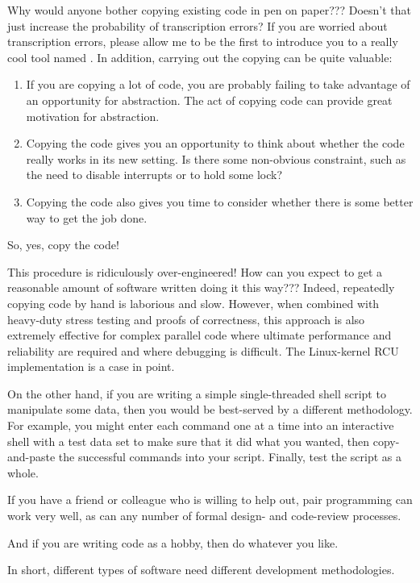 \QuickQ{}
	Why would anyone bother copying existing code in pen on paper???
	Doesn't that just increase the probability of transcription errors?
\QuickA{}
	If you are worried about transcription errors, please allow me
	to be the first to introduce you to a really cool tool named
	.
	In addition, carrying out the copying can be quite valuable:
	\begin{enumerate}
	\item	If you are copying a lot of code, you are probably failing
		to take advantage of an opportunity for abstraction.
		The act of copying code can provide great motivation
		for abstraction.
	\item	Copying the code gives you an opportunity to think about
		whether the code really works in its new setting.
		Is there some non-obvious constraint, such as the need
		to disable interrupts or to hold some lock?
	\item	Copying the code also gives you time to consider whether
		there is some better way to get the job done.
	\end{enumerate}
	So, yes, copy the code!

\QuickQ{}
	This procedure is ridiculously over-engineered!
	How can you expect to get a reasonable amount of software
	written doing it this way???
\QuickA{}
	Indeed, repeatedly copying code by hand is laborious and slow.
	However, when combined with heavy-duty stress testing and
	proofs of correctness, this approach is also extremely effective
	for complex parallel code where ultimate performance and
	reliability are required and where debugging is difficult.
	The Linux-kernel RCU implementation is a case in point.

	On the other hand, if you are writing a simple single-threaded
	shell script to manipulate some data, then you would be
	best-served by a different methodology.
	For example, you might enter each command one at a time
	into an interactive shell with a test data set to make
	sure that it did what you wanted, then copy-and-paste the
	successful commands into your script.
	Finally, test the script as a whole.

	If you have a friend or colleague who is willing to help out,
	pair programming can work very well, as can any number of
	formal design- and code-review processes.

	And if you are writing code as a hobby, then do whatever you like.

	In short, different types of software need different development
	methodologies.

